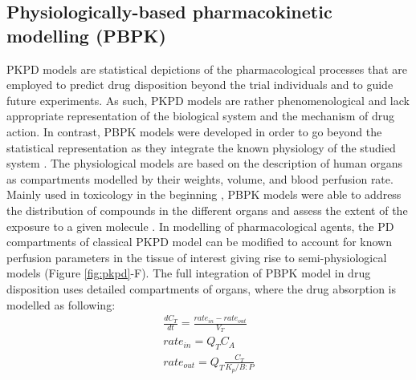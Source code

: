 \subsection{Physiologically-based pharmacokinetic modelling (PBPK)}
PKPD models are statistical depictions of the pharmacological processes that are employed to predict drug disposition beyond the trial individuals and to guide future experiments. As such, PKPD models are rather phenomenological and lack appropriate representation of the biological system and the mechanism of drug action. In contrast, PBPK models were developed in order to go beyond the statistical representation as they integrate the known physiology of the studied system \cite{jones2013basic}. The physiological models are based on the description of human organs as compartments modelled by their weights, volume, and blood perfusion rate. Mainly used in toxicology in the beginning \cite{andersen2005introduction}, PBPK models were able to address the distribution of compounds in the different organs and assess the extent of the exposure to a given molecule \cite{peters2012physiologically}. In modelling of pharmacological agents, the PD compartments of classical PKPD model can be modified to account for known perfusion parameters in the tissue of interest giving rise to semi-physiological models \cite{wang2008preclinical} (Figure \ref{fig:pkpd}-F). The full integration of PBPK model in drug disposition uses detailed compartments of organs, where the drug absorption is modelled as following:
\begin{equation} \label{eq:PKPD}
\begin{gathered}
\frac{dC_{T}}{dt}=\frac{rate_{in}-rate_{out}}{V_{T}}\\
rate_{in}=Q_{T}C_{A}\\
rate_{out}=Q_{T} \frac{C_{T}}{K_{p}/B:P}
\end{gathered}
\end{equation}
